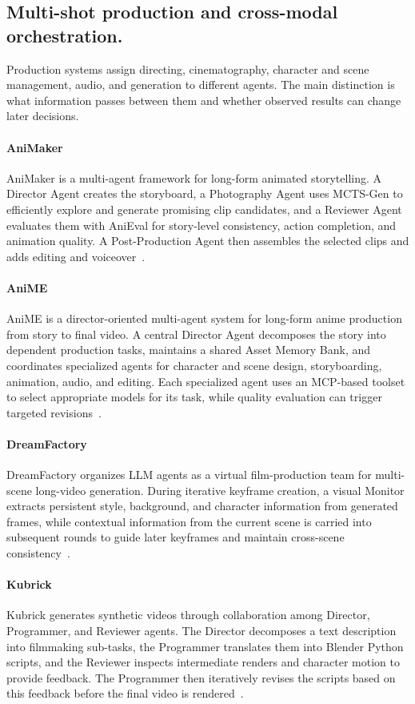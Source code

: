 \subsection{Multi-shot production and cross-modal orchestration.}
Production systems assign directing, cinematography, character and scene management, audio, and generation to different agents. The main distinction is what information passes between them and whether observed results can change later decisions.

\paragraph{AniMaker}
AniMaker is a multi-agent framework for long-form animated storytelling. A Director Agent creates the storyboard, a Photography Agent uses MCTS-Gen to efficiently explore and generate promising clip candidates, and a Reviewer Agent evaluates them with AniEval for story-level consistency, action completion, and animation quality. A Post-Production Agent then assembles the selected clips and adds editing and voiceover~\cite{avg250610540}.

\paragraph{AniME}
AniME is a director-oriented multi-agent system for long-form anime production from story to final video. A central Director Agent decomposes the story into dependent production tasks, maintains a shared Asset Memory Bank, and coordinates specialized agents for character and scene design, storyboarding, animation, audio, and editing. Each specialized agent uses an MCP-based toolset to select appropriate models for its task, while quality evaluation can trigger targeted revisions~\cite{avg250818781}.

\paragraph{DreamFactory}
DreamFactory organizes LLM agents as a virtual film-production team for multi-scene long-video generation. During iterative keyframe creation, a visual Monitor extracts persistent style, background, and character information from generated frames, while contextual information from the current scene is carried into subsequent rounds to guide later keyframes and maintain cross-scene consistency~\cite{xie2024dreamfactory}.

\paragraph{Kubrick}
Kubrick generates synthetic videos through collaboration among Director, Programmer, and Reviewer agents. The Director decomposes a text description into filmmaking sub-tasks, the Programmer translates them into Blender Python scripts, and the Reviewer inspects intermediate renders and character motion to provide feedback. The Programmer then iteratively revises the scripts based on this feedback before the final video is rendered~\cite{he2024kubrick}.

